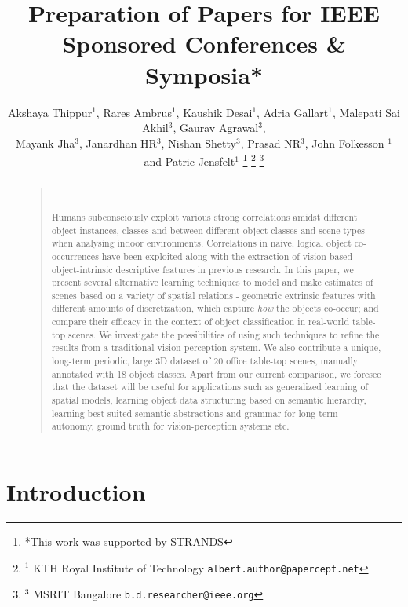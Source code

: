 \documentclass[letterpaper, 10 pt, conference]{ieeeconf}  %
\title{\LARGE \bf
Preparation of Papers for IEEE Sponsored Conferences \& Symposia*
}
\author{Akshaya Thippur$^{1}$, Rares Ambrus$^{1}$, Kaushik Desai$^{1}$, Adria Gallart$^{1}$, Malepati Sai Akhil$^{3}$, Gaurav Agrawal$^{3}$,\\Mayank Jha$^{3}$, Janardhan HR$^{3}$, Nishan Shetty$^{3}$, Prasad NR$^{3}$, John Folkesson $^{1}$ and Patric Jensfelt$^{1}$%
\thanks{*This work was supported by STRANDS}%
\thanks{$^{1}$ KTH Royal Institute of Technology
        {\tt\small albert.author@papercept.net}}%
\thanks{$^{3}$ MSRIT Bangalore
        {\tt\small b.d.researcher@ieee.org}}%
}
\begin{document}
\maketitle
\thispagestyle{empty}
\pagestyle{empty}


\begin{abstract}
\begin{quote}\

Humans subconsciously exploit various strong correlations amidst different object instances, classes and between different object classes and scene types when analysing indoor environments. Correlations in naive, logical object co-occurrences have been exploited along with the extraction of vision based object-intrinsic descriptive features in previous research. In this paper, we present several alternative learning techniques to model and make estimates of scenes based on a variety of spatial relations - geometric extrinsic features with different amounts of discretization, which capture \textit{how} the objects co-occur; and compare their efficacy in the context of object classification in real-world table-top scenes. We investigate the possibilities of using such techniques to refine the results from a traditional vision-perception system. We also contribute a unique, long-term periodic, large 3D dataset of 20 office table-top scenes, manually annotated with 18 object classes. Apart from our current comparison, we foresee that the dataset will be useful for applications such as generalized learning of spatial models, learning object data structuring based on semantic hierarchy, learning best suited semantic abstractions and grammar for long term autonomy, ground truth for vision-perception systems etc.
\end{quote}
\end{abstract}


\section{Introduction}
\label{sec:Introduction}
\end{document}
